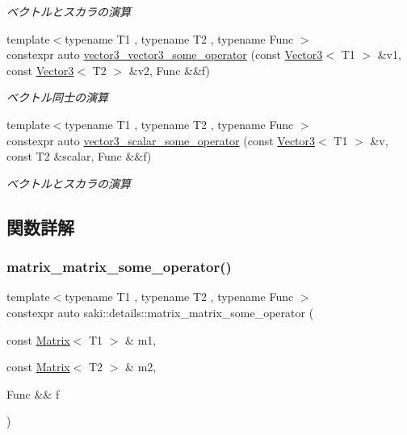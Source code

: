 \begin{DoxyCompactItemize}
\begin{DoxyCompactList}\small\item\em ベクトルとスカラの演算 \end{DoxyCompactList}\item 
{\footnotesize template$<$typename T1 , typename T2 , typename Func $>$ }\\constexpr auto \mbox{\hyperlink{namespacesaki_1_1details_a9d9fd5673ab6516752ecf05845e7f9b9}{vector3\+\_\+vector3\+\_\+some\+\_\+operator}} (const \mbox{\hyperlink{classsaki_1_1_vector3}{Vector3}}$<$ T1 $>$ \&v1, const \mbox{\hyperlink{classsaki_1_1_vector3}{Vector3}}$<$ T2 $>$ \&v2, Func \&\&f)
\begin{DoxyCompactList}\small\item\em ベクトル同士の演算 \end{DoxyCompactList}\item 
{\footnotesize template$<$typename T1 , typename T2 , typename Func $>$ }\\constexpr auto \mbox{\hyperlink{namespacesaki_1_1details_a65a656e3fd6cb4f45afc9137f5e6383a}{vector3\+\_\+scalar\+\_\+some\+\_\+operator}} (const \mbox{\hyperlink{classsaki_1_1_vector3}{Vector3}}$<$ T1 $>$ \&v, const T2 \&scalar, Func \&\&f)
\begin{DoxyCompactList}\small\item\em ベクトルとスカラの演算 \end{DoxyCompactList}\end{DoxyCompactItemize}


\subsection{関数詳解}
\mbox{\label{namespacesaki_1_1details_ab331ad2e5330aa422492d228d522aeea}} 
\subsubsection{\texorpdfstring{matrix\+\_\+matrix\+\_\+some\+\_\+operator()}{matrix\_matrix\_some\_operator()}}
{\footnotesize\ttfamily template$<$typename T1 , typename T2 , typename Func $>$ \\
constexpr auto saki\+::details\+::matrix\+\_\+matrix\+\_\+some\+\_\+operator (\begin{DoxyParamCaption}\item[{const \mbox{\hyperlink{classsaki_1_1_matrix}{Matrix}}$<$ T1 $>$ \&}]{m1,  }\item[{const \mbox{\hyperlink{classsaki_1_1_matrix}{Matrix}}$<$ T2 $>$ \&}]{m2,  }\item[{Func \&\&}]{f }\end{DoxyParamCaption})}




